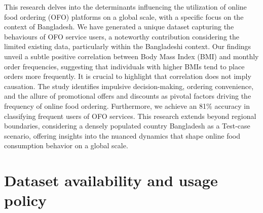 \documentclass[a4paper,fleqn]{cas-sc}
\begin{document}
This research delves into the determinants influencing the utilization of online food ordering (OFO) platforms on a global scale, with a specific focus on the context of Bangladesh. We have generated a unique dataset capturing the behaviours of OFO service users, a noteworthy contribution considering the limited existing data, particularly within the Bangladeshi context. Our findings unveil a subtle positive correlation between Body Mass Index (BMI) and monthly order frequencies, suggesting that individuals with higher BMIs tend to place orders more frequently. It is crucial to highlight that correlation does not imply causation. The study identifies impulsive decision-making, ordering convenience, and the allure of promotional offers and discounts as pivotal factors driving the frequency of online food ordering. Furthermore, we achieve an 81\% accuracy in classifying frequent users of OFO services. This research extends beyond regional boundaries, considering a densely populated country Bangladesh as a Test-case scenario, offering insights into the nuanced dynamics that shape online food consumption behavior on a global scale.


\section*{Dataset availability and usage policy}
\end{document}
